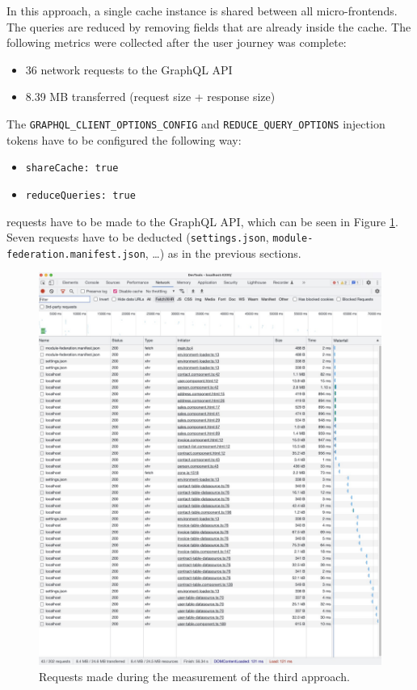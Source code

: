 In this approach, a single cache instance is shared between all micro-frontends. The queries are reduced by removing fields that are already inside the cache. The following metrics were collected after the user journey was complete:

\begin{itemize}
  \item 36 network requests to the GraphQL \ac{API}
  \item 8.39 MB transferred (request size + response size)
\end{itemize}

\noindent The \texttt{GRAPHQL\_CLIENT\_OPTIONS\_CONFIG} and \texttt{REDUCE\_QUERY\_OPTIONS} injection tokens have to be configured the following way:

\begin{itemize}
  \item \texttt{shareCache: true}
  \item \texttt{reduceQueries: true}
\end{itemize}

 requests have to be made to the GraphQL \ac{API}, which can be seen in Figure \ref{fig:results:shared-cache-reduction}. Seven requests have to be deducted (\texttt{settings.json}, \texttt{module-federation.manifest.json}, \dots) as in the previous sections.

\ifshowImages
\begin{figure}[H]
  \centering
  \includegraphics[width=0.8\linewidth]{images/results/1-attempt/shared-reduced-cache.jpg}
  \caption{Requests made during the measurement of the third approach.}\label{fig:results:shared-cache-reduction}
\end{figure}
\fi

